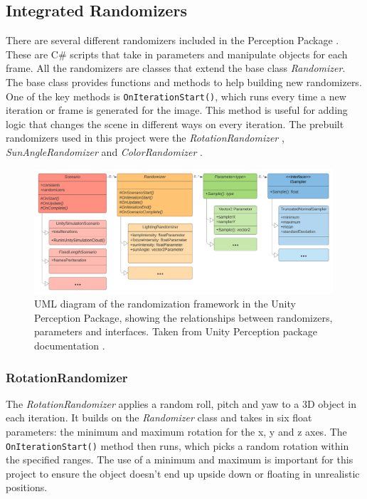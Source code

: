 \subsection{Integrated Randomizers}
\label{section:Integrated Randomizers}
There are several different randomizers included in the Perception Package \cite{unity-perception2022}. These are C\# scripts that take in parameters and manipulate objects for each frame. All the randomizers are classes that extend the base class \textit{Randomizer}. The base class provides functions and methods to help building new randomizers. One of the key methods is \texttt{OnIterationStart()}, which runs every time a new iteration or frame is generated for the image. This method is useful for adding logic that changes the scene in different ways on every iteration. The prebuilt randomizers used in this project were the \textit{RotationRandomizer} \cite{rotation_randomizer}, \textit{SunAngleRandomizer} \cite{sun_angle_randomizer} and \textit{ColorRandomizer} \cite{color_randomizer}.

\begin{figure}[H]
    \centering
    \includegraphics[width=0.99\textwidth]{Figures/randomization_uml.png}
    \caption{UML diagram of the randomization framework in the Unity Perception Package, showing the relationships between randomizers, parameters and interfaces. Taken from Unity Perception package documentation \cite{UMLdiagram}.}
    \label{fig:randomizer class uml}
    
\end{figure}

\subsubsection{RotationRandomizer}
The \textit{RotationRandomizer} \cite{rotation_randomizer} applies a random roll, pitch and yaw to a 3D object in each iteration. It builds on the \textit{Randomizer} class and takes in six float parameters: the minimum and maximum rotation for the x, y and z axes. The \texttt{OnIterationStart()} method then runs, which picks a random rotation within the specified ranges. The use of a minimum and maximum is important for this project to ensure the object doesn’t end up upside down or floating in unrealistic positions.

